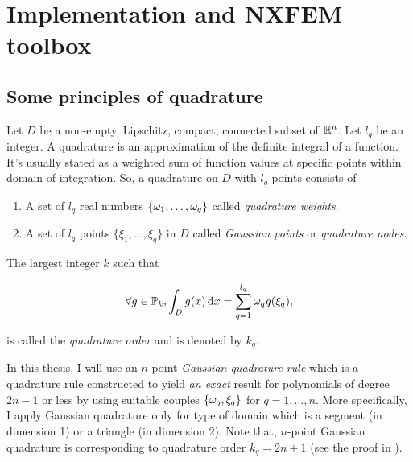 \documentclass[../main.tex]{subfiles}
\begin{document}
\chapter{Implementation and NXFEM toolbox}
\label{chap:app-a}

\section{Some principles of quadrature}
\label{sec:app-quadrature}

\begin{definition}[Quadrature]\label{def:quadrature}
  \cite{Ern2013FEM} Let $D$ be a non-empty, Lipschitz, compact, connected subset of $\mathbb{R}^n$. Let $l_q$ be an integer. A quadrature is an approximation of the definite integral of a function. It's usually stated as a weighted sum of function values at specific points within domain of integration. So, a quadrature on $D$ with $l_q$ points consists of

  \begin{enumerate}[label=\normalfont(\roman*)]
    \item A set of $l_q$ real numbers $\{\omega_1,\ldots,\omega_q\}$ called \textit{quadrature weights}.
    \item A set of $l_q$ points $\{\xi_1,\ldots,\xi_q\}$ in $D$ called \textit{Gaussian points} or \textit{quadrature nodes}.
  \end{enumerate}

  The largest integer $k$ such that

  \begin{align*}
    \forall g\in \mbb{P}_k,
    \int_D g(x)\dif x 
      = \sum_{q=1}^{l_q} \omg_q g(\xi_q), 
  \end{align*}

  is called the \textit{quadrature order} and is denoted by $k_q$.
\end{definition}

In this thesis, I will use an $n$-point \textit{Gaussian quadrature rule} which is a quadrature rule constructed to yield \textit{an exact} result for polynomials of degree $2n-1$ or less by using suitable couples $\{\omega_q,\xi_q\}$ for $q=1,\ldots,n$. More specifically, I apply Gaussian quadrature only for type of domain which is a segment (in dimension 1) or a triangle (in dimension 2). Note that, $n$-point Gaussian quadrature is corresponding to quadrature order $k_q=2n+1$ (see the proof in \cite[Proposition~8.2]{Ern2013FEM}).
\end{document}
